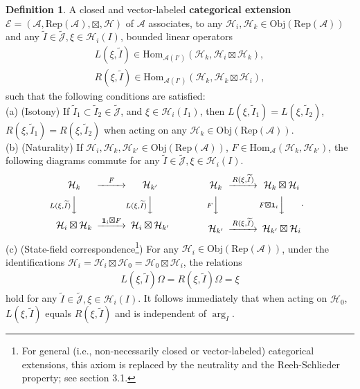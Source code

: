 \documentclass[11pt,b5paper,notitlepage]{article}
\theoremstyle{definition}
\newtheorem{df}{Definition}[subsection]
\theoremstyle{plain}
\newcommand{\fk}{\mathfrak}
\newcommand{\mc}{\mathcal}
\newcommand{\wtd}{\widetilde}
\newcommand{\id}{\mathbf{1}}
\newcommand{\Hom}{\mathrm{Hom}}
\newcommand{\scr}{\mathscr}
\newcommand{\Jtd}{\widetilde{\mathcal J}}
\newcommand{\RepA}{\mathrm{Rep}(\mc A)}
\newcommand{\Obj}{\mathrm{Obj}}
\numberwithin{equation}{subsection}
\begin{document}
\begin{df}
	A closed and  vector-labeled \textbf{categorical extension} $\scr E=(\mc A,\RepA,\boxtimes,\mc H)$ of $\mc A$ associates, to any  $\mc H_i,\mc H_k\in\Obj(\RepA)$ and any $\wtd I\in\Jtd,\fk \xi\in\mc H_i(I)$, bounded linear operators
	\begin{gather*}
	L(\xi,\wtd I)\in\Hom_{\mc A(I')}(\mc H_k,\mc H_i\boxtimes\mc H_k),\\
	R(\xi,\wtd I)\in\Hom_{\mc A(I')}(\mc H_k,\mc H_k\boxtimes\mc H_i),
	\end{gather*}
	such that the following conditions are satisfied:\\
	(a) (Isotony) If $\wtd I_1\subset\wtd I_2\in\Jtd$, and $\xi\in\mc H_i(I_1)$, then $L(\xi,\wtd I_1)=L(\xi,\wtd I_2)$, $R(\xi,\wtd I_1)=R(\xi,\wtd I_2)$ when acting on any  $\mc H_k\in\Obj(\RepA)$.\\
	(b) (Naturality) If $\mc H_{i},\mc H_k,\mc H_{k'}\in\Obj(\RepA)$, $F\in\Hom_{\mc A}(\mc H_k,\mc H_{k'})$,  the following diagrams commute for any $\wtd I\in\Jtd,\xi\in\mc H_i(I)$.
	\begin{gather}
	\begin{CD}
	\mc H_k @>F>> \mc H_{k'}\\
	@V L(\xi,\wtd I)  VV @V L(\xi,\wtd I)  VV\\
	\mc H_i\boxtimes\mc H_k @> \id_i\boxtimes F>> \mc H_i\boxtimes\mc H_{k'}
	\end{CD}\qquad\qquad
	\begin{CD}
	\mc H_k @> R(\xi,\wtd I)  >> \mc H_k\boxtimes\mc H_i\\
	@V F VV @V F\boxtimes\id_i  VV\\
	\mc H_{k'} @>R(\xi,\wtd I) >> \mc H_{k'}\boxtimes\mc H_i
	\end{CD}.
	\end{gather}
	(c) (State-field correspondence\footnote{For general (i.e., non-necessarily closed or vector-labeled) categorical extensions, this axiom is replaced by the neutrality and the Reeh-Schlieder property; see \cite{Gui21a} section 3.1.}) For any $\mc H_i\in\Obj(\RepA)$, under the identifications $\mc H_i=\mc H_i\boxtimes\mc H_0=\mc H_0\boxtimes\mc H_i$, the relations
	\begin{align}
	L(\xi,\wtd I)\Omega=R(\xi,\wtd I)\Omega=\xi
	\end{align}
	hold for any $\wtd I\in\Jtd,\xi\in\mc H_i(I)$. It follows immediately that when acting on $\mc H_0$, $L(\xi,\wtd I)$ equals $R(\xi,\wtd I)$ and is independent of $\arg_I$.\\

\end{df}
\end{document}

